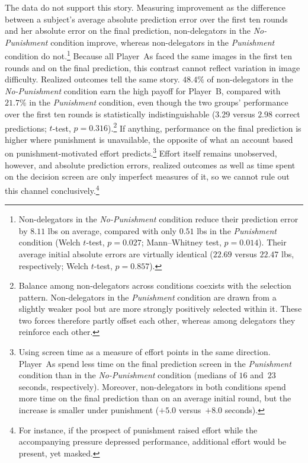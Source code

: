 The data do not support this story. %
Measuring improvement as the difference between a subject's average absolute prediction error over the first ten rounds and her absolute error on the final prediction, non-delegators in the \textit{No-Punishment} condition improve, whereas non-delegators in the \textit{Punishment} condition do not.\footnote{Non-delegators in the \textit{No-Punishment} condition reduce their prediction error by $8.11$ lbs on average, compared with only $0.51$ lbs in the \textit{Punishment} condition (Welch $t$-test, $p=0.027$; Mann--Whitney test, $p=0.014$). Their average initial absolute errors are virtually identical ($22.69$ versus $22.47$ lbs, respectively; Welch $t$-test, $p=0.857$).} Because all Player~As faced the same images in the first ten rounds and on the final prediction, this contrast cannot reflect variation in image difficulty. Realized outcomes tell the same story. $48.4\%$ of non-delegators in the \textit{No-Punishment} condition earn the high payoff for Player~B, compared with $21.7\%$ in the \textit{Punishment} condition, even though the two groups' performance over the first ten rounds is statistically indistinguishable ($3.29$ versus $2.98$ correct predictions; $t$-test, $p=0.316$).\footnote{Balance among non-delegators across conditions coexists with the selection pattern. Non-delegators in the \textit{Punishment} condition are drawn from a slightly weaker pool but are more strongly positively selected within it. These two forces therefore partly offset each other, whereas among delegators they reinforce each other.} If anything, performance on the final prediction is higher where punishment is unavailable, the opposite of what an account based on punishment-motivated effort predicts.\footnote{Using screen time as a measure of effort points in the same direction. Player~As spend less time on the final prediction screen in the \textit{Punishment} condition than in the \textit{No-Punishment} condition (medians of $16$ and\ $23$ seconds, respectively). Moreover, non-delegators in both conditions spend more time on the final prediction than on an average initial round, but the increase is smaller under punishment ($+5.0$ versus\ $+8.0$ seconds).} Effort itself remains unobserved, however, and absolute prediction errors, realized outcomes as well as time spent on the decision screen are only imperfect measures of it, so we cannot rule out this channel conclusively.\footnote{For instance, if the prospect of punishment raised effort while the accompanying pressure depressed performance, additional effort would be present, yet masked.}

